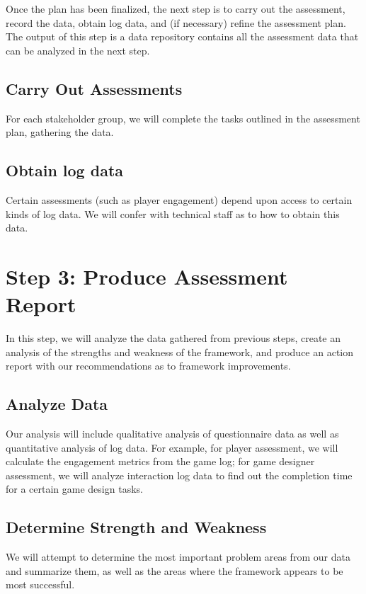 Once the plan has been finalized, the next step is to carry out the assessment, record the data, obtain log
data, and (if necessary) refine the assessment plan.  The output of this
step is a data repository contains all the assessment data that can be
analyzed in the next step.

\subsection{Carry Out Assessments}

For each stakeholder group, we will complete the tasks outlined in the
assessment plan, gathering the data.

\subsection{Obtain log data}

Certain assessments (such as player engagement) depend upon access to
certain kinds of log data.  We will confer with technical staff as to
how to obtain this data. 

\section{Step 3: Produce Assessment Report}

In this step, we will analyze the data gathered from previous steps,
create an analysis of the strengths and weakness of the framework, 
and produce an action report with our recommendations as to framework improvements.

\subsection{Analyze Data}

Our analysis will include qualitative analysis of questionnaire data
as well as quantitative analysis of log data. For example, for player
assessment, we will calculate the engagement metrics from the game
log; for game designer assessment, we will analyze interaction log
data to find out the completion time for a certain game design tasks.

\subsection{Determine Strength and Weakness}

We will attempt to determine the most important problem areas from our
data and summarize them, as well as the areas where the framework
appears to be most successful.

